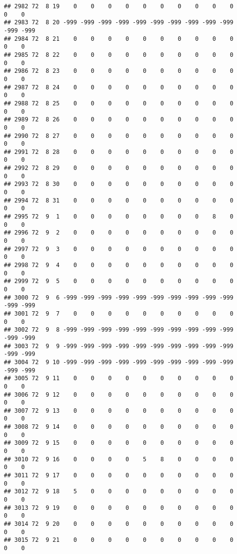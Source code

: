 \documentclass[]{article}
\begin{document}
\begin{verbatim}
## 2982 72  8 19    0    0    0    0    0    0    0    0    0    0    0    0
## 2983 72  8 20 -999 -999 -999 -999 -999 -999 -999 -999 -999 -999 -999 -999
## 2984 72  8 21    0    0    0    0    0    0    0    0    0    0    0    0
## 2985 72  8 22    0    0    0    0    0    0    0    0    0    0    0    0
## 2986 72  8 23    0    0    0    0    0    0    0    0    0    0    0    0
## 2987 72  8 24    0    0    0    0    0    0    0    0    0    0    0    0
## 2988 72  8 25    0    0    0    0    0    0    0    0    0    0    0    0
## 2989 72  8 26    0    0    0    0    0    0    0    0    0    0    0    0
## 2990 72  8 27    0    0    0    0    0    0    0    0    0    0    0    0
## 2991 72  8 28    0    0    0    0    0    0    0    0    0    0    0    0
## 2992 72  8 29    0    0    0    0    0    0    0    0    0    0    0    0
## 2993 72  8 30    0    0    0    0    0    0    0    0    0    0    0    0
## 2994 72  8 31    0    0    0    0    0    0    0    0    0    0    0    0
## 2995 72  9  1    0    0    0    0    0    0    0    0    8    0    0    0
## 2996 72  9  2    0    0    0    0    0    0    0    0    0    0    0    0
## 2997 72  9  3    0    0    0    0    0    0    0    0    0    0    0    0
## 2998 72  9  4    0    0    0    0    0    0    0    0    0    0    0    0
## 2999 72  9  5    0    0    0    0    0    0    0    0    0    0    0    0
## 3000 72  9  6 -999 -999 -999 -999 -999 -999 -999 -999 -999 -999 -999 -999
## 3001 72  9  7    0    0    0    0    0    0    0    0    0    0    0    0
## 3002 72  9  8 -999 -999 -999 -999 -999 -999 -999 -999 -999 -999 -999 -999
## 3003 72  9  9 -999 -999 -999 -999 -999 -999 -999 -999 -999 -999 -999 -999
## 3004 72  9 10 -999 -999 -999 -999 -999 -999 -999 -999 -999 -999 -999 -999
## 3005 72  9 11    0    0    0    0    0    0    0    0    0    0    0    0
## 3006 72  9 12    0    0    0    0    0    0    0    0    0    0    0    0
## 3007 72  9 13    0    0    0    0    0    0    0    0    0    0    0    0
## 3008 72  9 14    0    0    0    0    0    0    0    0    0    0    0    0
## 3009 72  9 15    0    0    0    0    0    0    0    0    0    0    0    0
## 3010 72  9 16    0    0    0    0    5    8    0    0    0    0    0    0
## 3011 72  9 17    0    0    0    0    0    0    0    0    0    0    0    0
## 3012 72  9 18    5    0    0    0    0    0    0    0    0    0    0    0
## 3013 72  9 19    0    0    0    0    0    0    0    0    0    0    0    0
## 3014 72  9 20    0    0    0    0    0    0    0    0    0    0    0    0
## 3015 72  9 21    0    0    0    0    0    0    0    0    0    0    0    0

\end{verbatim}
\end{document}

